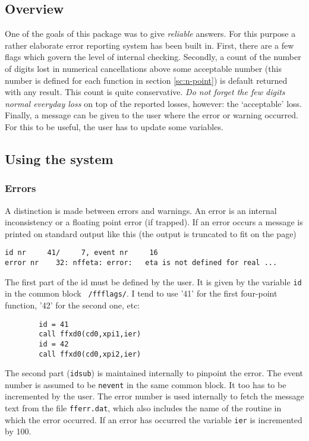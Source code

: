 \subsection{Overview}

One of the goals of this package was to give {\em reliable} answers.  For this 
purpose a rather elaborate error reporting system has been built in.  First, 
there are a few flags which govern the level of internal checking.  Secondly, 
a count of the number of digits lost in numerical cancellations above some 
acceptable number (this number is defined for each function in section 
\ref{sc:n-point}) is default returned with any result.  This count is quite 
conservative.  {\em Do not forget the few digits normal everyday loss} on top 
of the reported losses, however: the `acceptable' loss.  Finally, a message 
can be given to the user where the error or warning occurred.  For this to be 
useful, the user has to update some variables.

\subsection{Using the system}

\subsubsection{Errors}

A distinction is made between errors and warnings.  An error is an internal 
inconsistency or a floating point error (if trapped).  If an error occurs a 
message  is printed on standard output like this (the output is truncated to 
fit on the page)
\begin{verbatim}
id nr     41/     7, event nr     16
error nr    32: nffeta: error:   eta is not defined for real ...
\end{verbatim}
The first part of the id must be defined by the user.  It is given by the 
variable {\tt id} in the common block {\tt 
/ffflags/}.  I tend to use '41' for the first four-point function, '42' for 
the second one, etc:
\begin{verbatim}
        id = 41
        call ffxd0(cd0,xpi1,ier)
        id = 42
        call ffxd0(cd0,xpi2,ier)
\end{verbatim}
The second part ({\tt idsub}) is maintained internally to pinpoint the error.  
The event number is assumed to be {\tt nevent} in the same common block.  
It too has to be incremented by the user.  The error number is 
used internally to fetch the message text from the file {\tt fferr.dat}, which 
also includes the name of the routine in which the error occurred.  If an 
error has occurred the variable {\tt ier} is incremented by 100.

